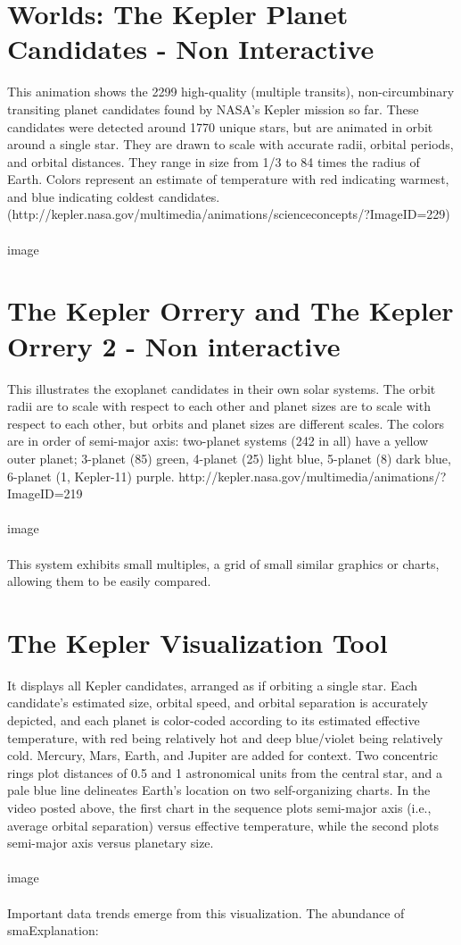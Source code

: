 \documentclass[11pt
              , a4paper
              , twoside
              , openright
              ]{report}
\begin{document}
\section{Worlds: The Kepler Planet Candidates - Non Interactive}
This animation shows the 2299 high-quality (multiple transits), non-circumbinary transiting planet candidates found by NASA's Kepler mission so far. These candidates were detected around 1770 unique stars, but are animated in orbit around a single star. They are drawn to scale with accurate radii, orbital periods, and orbital distances. They range in size from 1/3 to 84 times the radius of Earth. Colors represent an estimate of temperature with red indicating warmest, and blue indicating coldest candidates. (http://kepler.nasa.gov/multimedia/animations/scienceconcepts/?ImageID=229)
\\\\
image

\section{The Kepler Orrery and The Kepler Orrery 2 - Non interactive}
This illustrates the exoplanet candidates in their own solar systems. The orbit radii are to scale with respect to each other and planet sizes are to scale with respect to each other, but orbits and planet sizes are different scales. The colors are in order of semi-major axis: two-planet systems (242 in all) have a yellow outer planet; 3-planet (85) green, 4-planet (25) light blue, 5-planet (8) dark blue, 6-planet (1, Kepler-11) purple. http://kepler.nasa.gov/multimedia/animations/?ImageID=219
\\\\
image
\\\\
This system exhibits small multiples, a grid of small similar graphics or charts, allowing them to be easily compared.
\section{The Kepler Visualization Tool }
It displays all Kepler candidates, arranged as if orbiting a single star. Each candidate's estimated size, orbital speed, and orbital separation is accurately depicted, and each planet is color-coded according to its estimated effective temperature, with red being relatively hot and deep blue/violet being relatively cold. Mercury, Mars, Earth, and Jupiter are added for context. Two concentric rings plot distances of 0.5 and 1 astronomical units from the central star, and a pale blue line delineates Earth's location on two self-organizing charts. In the video posted above, the first chart in the sequence plots semi-major axis (i.e., average orbital separation) versus effective temperature, while the second plots semi-major axis versus planetary size.
\\\\
image
\\\\
Important data trends emerge from this visualization. The abundance of smaExplanation:
\end{document}
